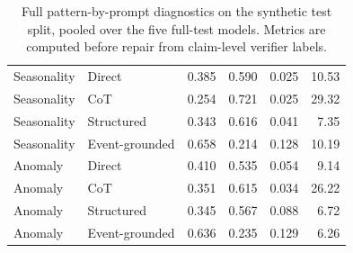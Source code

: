 \begin{table}[t]
{\begin{tabular}{llrrrr}
Seasonality & Direct & 0.385 & 0.590 & 0.025 & 10.53 \\
Seasonality & CoT & 0.254 & 0.721 & 0.025 & 29.32 \\
Seasonality & Structured & 0.343 & 0.616 & 0.041 & 7.35 \\
Seasonality & Event-grounded & 0.658 & 0.214 & 0.128 & 10.19 \\
Anomaly & Direct & 0.410 & 0.535 & 0.054 & 9.14 \\
Anomaly & CoT & 0.351 & 0.615 & 0.034 & 26.22 \\
Anomaly & Structured & 0.345 & 0.567 & 0.088 & 6.72 \\
Anomaly & Event-grounded & 0.636 & 0.235 & 0.129 & 6.26 \\
\bottomrule
\end{tabular}
}
\caption{Full pattern-by-prompt diagnostics on the synthetic test split, pooled over the five full-test models. Metrics are computed before repair from claim-level verifier labels.}
\label{tab:pattern-prompt-appendix}
\end{table}
